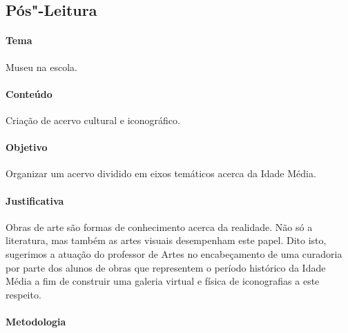 \documentclass[12pt]{extarticle}
\begin{document}
\subsection{Pós"-Leitura}

 \paragraph{Tema} Museu na escola.

 \paragraph{Conteúdo} Criação de acervo cultural e iconográfico.

 \paragraph{Objetivo} Organizar um acervo dividido em eixos temáticos acerca da Idade Média.

 \paragraph{Justificativa} Obras de arte são formas de conhecimento acerca da realidade. 
 Não só a literatura, mas também as artes visuais desempenham este papel. Dito isto,
 sugerimos a atuação do professor de Artes no encabeçamento de uma curadoria por 
 parte dos alunos de obras que representem o período histórico da Idade Média a fim
 de construir uma galeria virtual e física de iconografias a este respeito. 

 \paragraph{Metodologia}
 	
\end{document}
